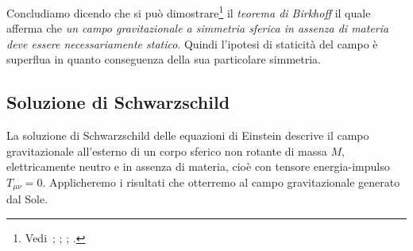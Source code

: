 Concludiamo dicendo che si può
dimostrare\footnote{Vedi~\textcite[390-393]{landau:campi};
  \textcite[843-844]{misner:gravitation};
  \textcite[337-340]{ohanian:gravitazione};
  \textcite[335-337]{weinberg:gravitation}.}  il \emph{teorema di Birkhoff} il quale afferma che \emph{un campo
  gravitazionale a simmetria sferica in assenza di materia deve essere
  necessariamente statico}.  Quindi l'ipotesi di staticità del campo è superflua
in quanto conseguenza della sua particolare simmetria.

\subsection{Soluzione di Schwarzschild}
\label{sec:metrica-schwarzschild}

La soluzione di Schwarzschild delle equazioni di Einstein descrive il campo
gravitazionale all'esterno di un corpo sferico non rotante di massa $M$,
elettricamente neutro e in assenza di materia, cioè con tensore energia-impulso
$T_{\mu\nu} = 0$.  Applicheremo i risultati che otterremo al campo
gravitazionale generato dal Sole.

